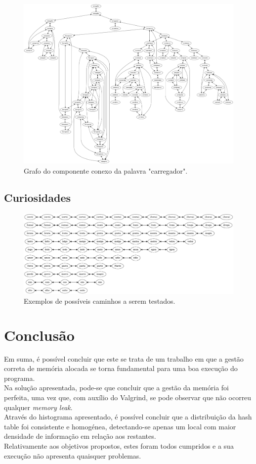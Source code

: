 \pagebreak
	\begin{figure}[h!]
    \centering
    \includegraphics[scale=0.19]{graph.png}
    \caption{Grafo do componente conexo da palavra "carregador".}
	\end{figure}
\pagebreak
	\section{Curiosidades}
	\begin{figure}[h!]
    \centering
    \includegraphics[scale=0.28]{curious.png}
    \caption{Exemplos de possíveis caminhos a serem testados.}
	\end{figure}
\chapter{Conclusão}
\label{conclusao}

Em suma, é possível concluir que este se trata de um trabalho em que a gestão correta de memória alocada se torna fundamental para uma boa execução do programa.\\
	Na solução apresentada, pode-se que concluir que a gestão da memória foi perfeita, uma vez que, com auxílio do Valgrind, se pode observar que não ocorreu qualquer \textit{memory leak}.\\
	Através do histograma apresentado, é possível concluir que a distribuição da hash table foi consistente e homogénea, detectando-se apenas um local com maior densidade de informação em relação aos restantes.\\
	Relativamente aos objetivos propostos, estes foram todos cumpridos e a sua execução não apresenta quaisquer problemas.

